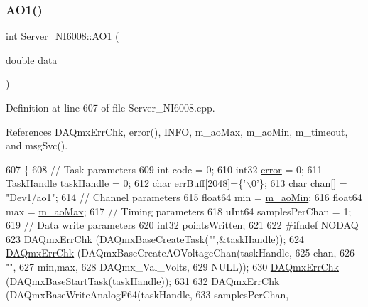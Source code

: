 \subsubsection{\texorpdfstring{A\+O1()}{AO1()}}
{\footnotesize\ttfamily int Server\+\_\+\+N\+I6008\+::\+A\+O1 (\begin{DoxyParamCaption}\item[{double}]{data }\end{DoxyParamCaption})}



Definition at line 607 of file Server\+\_\+\+N\+I6008.\+cpp.



References D\+A\+Qmx\+Err\+Chk, error(), I\+N\+FO, m\+\_\+ao\+Max, m\+\_\+ao\+Min, m\+\_\+timeout, and msg\+Svc().


\begin{DoxyCode}
607                                  \{
608   \textcolor{comment}{// Task parameters}
609   \textcolor{keywordtype}{int}         code  = 0;
610   int32       \hyperlink{classServer__NI6008_a7bcfa6ba683c63b68c624644ccfb8597}{error} = 0;
611   TaskHandle  taskHandle = 0;
612   \textcolor{keywordtype}{char}        errBuff[2048]=\{\textcolor{charliteral}{'\(\backslash\)0'}\};
613   \textcolor{keywordtype}{char}        chan[] = \textcolor{stringliteral}{"Dev1/ao1"};
614   \textcolor{comment}{// Channel parameters}
615   float64     min = \hyperlink{classServer__NI6008_ad650503ceebacea17688e04065130eaa}{m\_aoMin};
616   float64     max = \hyperlink{classServer__NI6008_a228a5d51f43daaf9eaea8e77cfa3334e}{m\_aoMax};
617   \textcolor{comment}{// Timing parameters}
618   uInt64      samplesPerChan = 1;
619   \textcolor{comment}{// Data write parameters}
620   int32       pointsWritten;
621 
622 \textcolor{preprocessor}{  #ifndef NODAQ}
623   \hyperlink{Server__NI6008_8cpp_a9e1338726dd5c84c9ea7f855cba19ad4}{DAQmxErrChk} (DAQmxBaseCreateTask(\textcolor{stringliteral}{""},&taskHandle));
624   \hyperlink{Server__NI6008_8cpp_a9e1338726dd5c84c9ea7f855cba19ad4}{DAQmxErrChk} (DAQmxBaseCreateAOVoltageChan(taskHandle,
625                         chan,
626                         \textcolor{stringliteral}{""},
627                         min,max,
628                         DAQmx\_Val\_Volts,
629                         NULL));
630   \hyperlink{Server__NI6008_8cpp_a9e1338726dd5c84c9ea7f855cba19ad4}{DAQmxErrChk} (DAQmxBaseStartTask(taskHandle));
631   
632   \hyperlink{Server__NI6008_8cpp_a9e1338726dd5c84c9ea7f855cba19ad4}{DAQmxErrChk} (DAQmxBaseWriteAnalogF64(taskHandle,
633                        samplesPerChan,

\end{DoxyCode}
